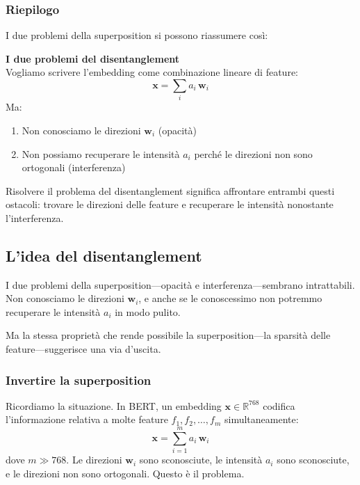 \subsubsection{Riepilogo}
I due problemi della superposition si possono riassumere così:
\begin{notebox}
\textbf{I due problemi del disentanglement}\\[0.5em]
Vogliamo scrivere l'embedding come combinazione lineare di feature:
\begin{equation*}
    \mathbf{x} = \sum_i a_i \, \mathbf{w}_i
\end{equation*}
Ma:
\begin{enumerate}
    \item Non conosciamo le direzioni $\mathbf{w}_i$ (opacità)
    \item Non possiamo recuperare le intensità $a_i$ perché le direzioni non sono ortogonali (interferenza)
\end{enumerate}
\end{notebox}
Risolvere il problema del disentanglement significa affrontare entrambi questi ostacoli: trovare le direzioni delle feature e recuperare le intensità nonostante l'interferenza.

\subsection{L'idea del disentanglement}
\label{subsec:idea_disentanglement}

I due problemi della superposition—opacità e interferenza—sembrano intrattabili. Non conosciamo le direzioni $\mathbf{w}_i$, e anche se le conoscessimo non potremmo recuperare le intensità $a_i$ in modo pulito.

Ma la stessa proprietà che rende possibile la superposition—la sparsità delle feature—suggerisce una via d'uscita.

\subsubsection{Invertire la superposition}

Ricordiamo la situazione. In BERT, un embedding $\mathbf{x} \in \mathbb{R}^{768}$ codifica l'informazione relativa a molte feature $f_1, f_2, \dots, f_m$ simultaneamente:
\begin{equation}
    \mathbf{x} = \sum_{i=1}^{m} a_i \, \mathbf{w}_i
\end{equation}
dove $m \gg 768$. Le direzioni $\mathbf{w}_i$ sono sconosciute, le intensità $a_i$ sono sconosciute, e le direzioni non sono ortogonali. Questo è il problema.

